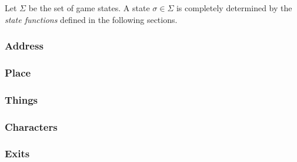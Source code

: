 Let $\Sigma$ be the set of game states. A state $\sigma \in \Sigma$ is
completely determined by the {\em state functions} defined in the
following sections.

\subsubsection{Address}
\label{sec:play:states:address}


\subsubsection{Place}
\label{sec:play:states:place}


\subsubsection{Things}


\subsubsection{Characters}


\subsubsection{Exits}

